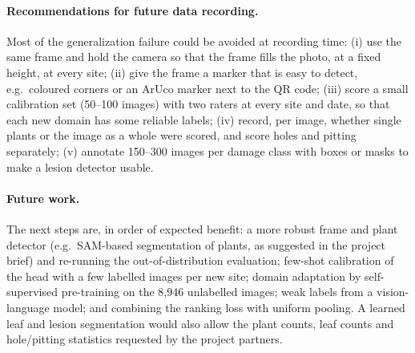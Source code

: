 \paragraph{Recommendations for future data recording.} Most of the generalization failure could be
avoided at recording time:
(i) use the same frame and hold the camera so that the frame fills the photo, at a fixed height,
at every site;
(ii) give the frame a marker that is easy to detect, e.g.\ coloured corners or an ArUco marker next
to the QR code;
(iii) score a small calibration set (50--100 images) with two raters at every site and date, so that
each new domain has some reliable labels;
(iv) record, per image, whether single plants or the image as a whole were scored, and score holes
and pitting separately;
(v) annotate 150--300 images per damage class with boxes or masks to make a lesion detector usable.

\paragraph{Future work.} The next steps are, in order of expected benefit: a more robust frame and
plant detector (e.g.\ SAM-based segmentation of plants, as suggested in the project brief) and
re-running the out-of-distribution evaluation; few-shot calibration of the head with a few
labelled images per new site; domain adaptation by self-supervised pre-training on the 8{,}946
unlabelled images; weak labels from a vision-language model; and combining the ranking loss with
uniform pooling. A learned leaf and lesion segmentation would also allow the plant counts, leaf
counts and hole/pitting statistics requested by the project partners.
